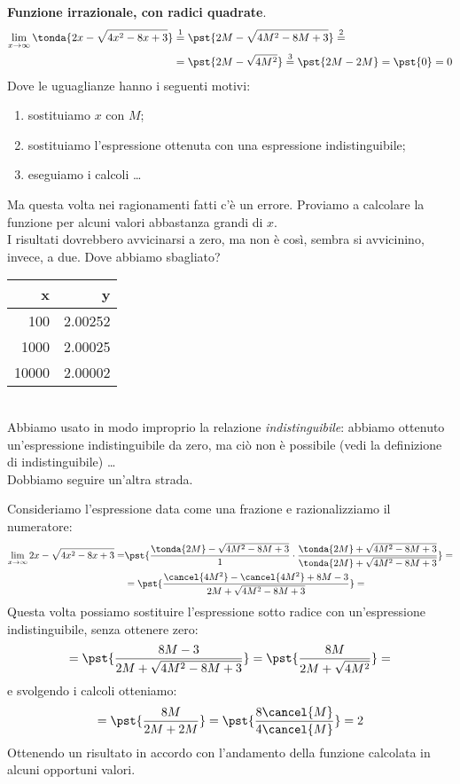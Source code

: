 \begin{esempio}
\textbf{Funzione irrazionale, con radici quadrate}.
\begin{align*}
\lim_{x \rightarrow \infty} \tonda{2x-\sqrt{4x^2-8x+3}} & \stackrel{1}{=} 
  \pst{2M-\sqrt{4M^2-8M+3}} \stackrel{2}{=} \\
  &=\pst{2M-\sqrt{4M^2}} \stackrel{3}{=} 
  \pst{2M-2M} = \pst{0} = 0
\end{align*}
Dove le uguaglianze hanno i seguenti motivi:
\begin{enumerate} [nosep]
 \item sostituiamo \(x\) con \(M\);
 \item sostituiamo l'espressione ottenuta con una espressione 
   indistinguibile;
 \item eseguiamo i calcoli \dots
\end{enumerate}
\vspace{1em}
\begin{minipage}{.69\textwidth}
Ma questa volta nei ragionamenti fatti c'è un errore. Proviamo a calcolare 
la funzione per alcuni valori abbastanza grandi di \(x\).\\
I risultati dovrebbero avvicinarsi a zero, ma non è così, sembra si 
avvicinino, invece, a due. Dove abbiamo sbagliato?
\end{minipage}
\begin{minipage}{.39\textwidth}
\begin{center}
\begin{tabular}{r|r}
x & y\\\hline
100 & 2.00252 \\
1000 & 2.00025 \\
10000 & 2.00002 \\
\end{tabular}
\end{center}
\end{minipage}\\

Abbiamo usato in modo improprio la relazione \emph{indistinguibile}: 
abbiamo ottenuto un'espressione indistinguibile da zero, ma ciò non è 
possibile (vedi la definizione di indistinguibile) \dots \\
Dobbiamo seguire un'altra strada.

Consideriamo l'espressione data come una frazione e razionalizziamo il 
numeratore:
\begin{align*}
\lim_{x \rightarrow \infty} 2x-\sqrt{4x^2-8x+3}=
&\pst{\frac{\tonda{2M}-\sqrt{4M^2-8M+3}}{1} \cdot 
\frac{\tonda{2M}+\sqrt{4M^2-8M+3}}{\tonda{2M}+\sqrt{4M^2-8M+3}}}=\\
&=\pst{\frac{\cancel{4M^2}-\cancel{4M^2}+8M-3}{2M+\sqrt{4M^2-8M+3}}}=
\end{align*}
Questa volta possiamo sostituire l'espressione sotto radice con 
un'espressione indistinguibile, senza ottenere zero:
\[=\pst{\frac{8M-3}{2M+\sqrt{4M^2-8M+3}}} =
   \pst{\frac{8M}{2M+\sqrt{4M^2}}}=\]
e svolgendo i calcoli otteniamo:
\[=\pst{\frac{8M}{2M+2M}}=
   \pst{\frac{8\cancel{M}}{4\cancel{M}}} = 2\]
Ottenendo un risultato in accordo con l'andamento della funzione calcolata 
in alcuni opportuni valori.
\end{esempio}

